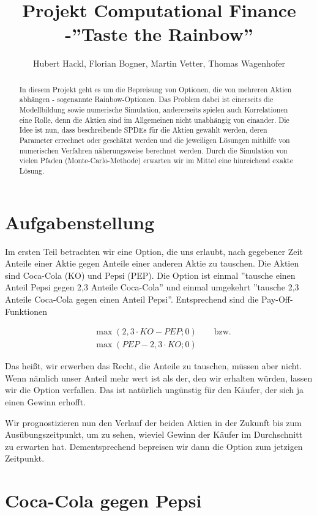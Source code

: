 \documentclass[12pt]{article}
\title{Projekt Computational Finance -''Taste the Rainbow''}
\author{Hubert Hackl, Florian Bogner, Martin Vetter, Thomas Wagenhofer}
\begin{document}
\maketitle

\begin{abstract}
In diesem Projekt geht es um die Bepreisung von Optionen, die von mehreren Aktien abhängen - sogenannte Rainbow-Optionen. Das Problem dabei ist einerseits die Modellbildung sowie numerische Simulation, andererseits spielen auch Korrelationen eine Rolle, denn die Aktien sind im Allgemeinen nicht unabhängig von einander. Die Idee ist nun, dass beschreibende SPDEs für die Aktien gewählt werden, deren Parameter errechnet oder geschätzt werden und die jeweiligen Lösungen mithilfe von numerischen Verfahren näherungsweise berechnet werden. Durch die Simulation von vielen Pfaden (Monte-Carlo-Methode) erwarten wir im Mittel eine hinreichend exakte Lösung.
\end{abstract}


\section{Aufgabenstellung}

Im ersten Teil betrachten wir eine Option, die uns erlaubt, nach gegebener Zeit Anteile einer Aktie gegen Anteile einer anderen Aktie zu tauschen. Die Aktien sind Coca-Cola (KO) und Pepsi (PEP). Die Option ist einmal ''tausche einen Anteil Pepsi gegen 2,3 Anteile Coca-Cola'' und einmal umgekehrt ''tausche 2,3 Anteile Coca-Cola gegen einen Anteil Pepsi''. Entsprechend sind die Pay-Off-Funktionen

\begin{align*}
&\max(2,3\cdot KO - PEP; 0) \qquad \text{bzw.} \\
&\max(PEP - 2,3\cdot KO; 0)
\end{align*}

Das heißt, wir erwerben das Recht, die Anteile zu tauschen, müssen aber nicht. Wenn nämlich unser Anteil mehr wert ist als der, den wir erhalten würden, lassen wir die Option verfallen. Das ist natürlich ungünstig für den Käufer, der sich ja einen Gewinn erhofft.

Wir prognostizieren nun den Verlauf der beiden Aktien in der Zukunft bis zum Ausübungszeitpunkt, um zu sehen, wieviel Gewinn der Käufer im Durchschnitt zu erwarten hat. Dementsprechend bepreisen wir dann die Option zum jetzigen Zeitpunkt.


\section{Coca-Cola gegen Pepsi}
\end{document}
